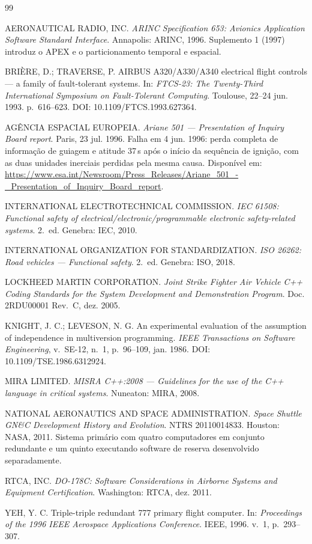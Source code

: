 \documentclass[10pt,a4paper,landscape]{article}
\begin{document}
\begin{thebibliography}{99}
\footnotesize

AERONAUTICAL RADIO, INC. \emph{ARINC Specification 653: Avionics Application Software Standard Interface}. Annapolis: ARINC, 1996. Suplemento 1 (1997) introduz o APEX e o particionamento temporal e espacial.

BRIÈRE, D.; TRAVERSE, P. AIRBUS A320/A330/A340 electrical flight controls --- a family of fault-tolerant systems. In: \emph{FTCS-23: The Twenty-Third International Symposium on Fault-Tolerant Computing}. Toulouse, 22--24 jun. 1993. p.~616--623. DOI: 10.1109/FTCS.1993.627364.

AGÊNCIA ESPACIAL EUROPEIA. \emph{Ariane 501 --- Presentation of Inquiry Board report}. Paris, 23 jul. 1996. Falha em 4 jun. 1996: perda completa de informação de guiagem e atitude 37\,s após o início da sequência de ignição, com as duas unidades inerciais perdidas pela mesma causa. Disponível em: \url{https://www.esa.int/Newsroom/Press_Releases/Ariane_501_-_Presentation_of_Inquiry_Board_report}.

INTERNATIONAL ELECTROTECHNICAL COMMISSION. \emph{IEC 61508: Functional safety of electrical/electronic/programmable electronic safety-related systems}. 2.~ed. Genebra: IEC, 2010.

INTERNATIONAL ORGANIZATION FOR STANDARDIZATION. \emph{ISO 26262: Road vehicles --- Functional safety}. 2.~ed. Genebra: ISO, 2018.

LOCKHEED MARTIN CORPORATION. \emph{Joint Strike Fighter Air Vehicle C++ Coding Standards for the System Development and Demonstration Program}. Doc. 2RDU00001 Rev.~C, dez. 2005.

KNIGHT, J. C.; LEVESON, N. G. An experimental evaluation of the assumption of independence in multiversion programming. \emph{IEEE Transactions on Software Engineering}, v.~SE-12, n.~1, p.~96--109, jan. 1986. DOI: 10.1109/TSE.1986.6312924.

MIRA LIMITED. \emph{MISRA C++:2008 --- Guidelines for the use of the C++ language in critical systems}. Nuneaton: MIRA, 2008.

NATIONAL AERONAUTICS AND SPACE ADMINISTRATION. \emph{Space Shuttle GN\&C Development History and Evolution}. NTRS 20110014833. Houston: NASA, 2011. Sistema primário com quatro computadores em conjunto redundante e um quinto executando software de reserva desenvolvido separadamente.

RTCA, INC. \emph{DO-178C: Software Considerations in Airborne Systems and Equipment Certification}. Washington: RTCA, dez. 2011.

YEH, Y. C. Triple-triple redundant 777 primary flight computer. In: \emph{Proceedings of the 1996 IEEE Aerospace Applications Conference}. IEEE, 1996. v.~1, p.~293--307.

\end{thebibliography}
\end{document}
